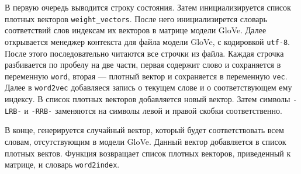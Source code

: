 В первую очередь выводится строку состояния. Затем инициализируется список плотных векторов \texttt{weight\_vectors}. После него инициализирется словарь соответствий слов индексам их векторов в матрице модели GloVe. Далее открывается менеджер контекста для файла модели GloVe, с кодировкой \texttt{utf-8}. После этого последовательно читаются все строчки из файла. Каждая строчка разбивается по пробелу на две части, первая содержит слово и сохраняется в переменную \texttt{word}, вторая --- плотный вектор и сохраняется в переменную \texttt{vec}. Далее в \texttt{word2vec} добавляеся запись о текущем слове и о соответствующем ему индексу. В список плотных векторов добавляется новый вектор. Затем символы \texttt{-LRB-} и \texttt{-RRB-} заменяются на символы левой и правой скобки соответственно.

В конце, генерируется случайный вектор, который будет соответствовать всем словам, отсутствующим в модели GloVe. Данный вектор добавляется в список плотных вектов. Функция возвращает список плотных векторов, приведенный к матрице, и словарь \texttt{word2index}.